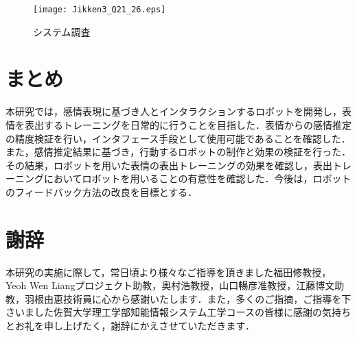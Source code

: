\documentclass[titlepage]{jarticle}
\begin{document}
\begin{figure}[h]
\begin{center}
\texttt{[image: Jikken3\_Q21\_26.eps]}
\end{center}
\caption{システム調査}
\label{Jikken3_Q3} %
\end{figure}


\afterpage{\clearpage}
\clearpage
\section{{まとめ}}
本研究では，感情表現に基づき人とインタラクションするロボットを開発し，表情を表出するトレーニングを日常的に行うことを目指した．表情からの感情推定の精度検証を行い，インタフェース手段として使用可能であることを確認した．また，感情推定結果に基づき，行動するロボットの制作と効果の検証を行った．その結果，ロボットを用いた表情の表出トレーニングの効果を確認し，表出トレーニングにおいてロボットを用いることの有意性を確認した．今後は，ロボットのフィードバック方法の改良を目標とする．

\afterpage{\clearpage}
\newpage
\section*{{謝辞}}
本研究の実施に際して，常日頃より様々なご指導を頂きました福田修教授，Yeoh Wen Liangプロジェクト助教，奥村浩教授，山口暢彦准教授，江藤博文助教，羽根由恵技術員に心から感謝いたします．また，多くのご指摘，ご指導を下さいました佐賀大学理工学部知能情報システム工学コースの皆様に感謝の気持ちとお礼を申し上げたく，謝辞にかえさせていただきます．
\end{document}
